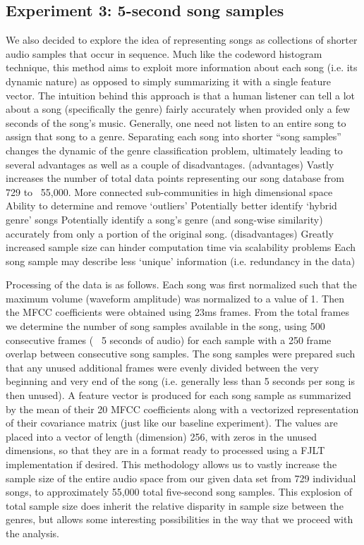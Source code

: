 \documentclass[10pt]{article}
\begin{document}
\subsection{Experiment 3: 5-second song samples}
We also decided to explore the idea of representing songs as collections of shorter audio samples that occur in sequence.  Much like the codeword histogram technique, this method aims to exploit more information about each song (i.e. its dynamic nature) as opposed to simply summarizing it with a single feature vector.  The intuition behind this approach is that a human listener can tell a lot about a song (specifically the genre) fairly accurately when provided only a few seconds of the song’s music.  Generally, one need not listen to an entire song to assign that song to a genre.  Separating each song into shorter “song samples” changes the dynamic of the genre classification problem, ultimately leading to several advantages as well as a couple of disadvantages.
(advantages)
Vastly increases the number of total data points representing our song database from 729 to ~55,000.
More connected sub-communities in high dimensional space
Ability to determine and remove ‘outliers’
Potentially better identify ‘hybrid genre’ songs
Potentially identify a song’s genre (and song-wise similarity) accurately from only a portion of the original song.
(disadvantages)
Greatly increased sample size can hinder computation time via scalability problems
Each song sample may describe less ‘unique’ information (i.e. redundancy in the data)

Processing of the data is as follows.  Each song was first normalized such that the maximum volume (waveform amplitude) was normalized to a value of 1.  Then the MFCC coefficients were obtained using 23ms frames.  From the total frames we determine the number of song samples available in the song, using 500 consecutive frames (~ 5 seconds of audio) for each sample with a 250 frame overlap between consecutive song samples.  The song samples were prepared such that any unused additional frames were evenly divided between the very beginning and very end of the song (i.e. generally less than 5 seconds per song is then unused).
A feature vector is produced for each song sample as summarized by the mean of their 20 MFCC coefficients along with a vectorized representation of their covariance matrix (just like our baseline experiment).  The values are placed into a vector of length (dimension) 256, with zeros in the unused dimensions, so that they are in a format ready to processed using a FJLT implementation if desired.  
This methodology allows us to vastly increase the sample size of the entire audio space from our given data set from 729 individual songs, to approximately 55,000 total five-second song samples.  This explosion of total sample size does inherit the relative disparity in sample size between the genres, but allows some interesting possibilities in the way that we proceed with the analysis.
\end{document}
